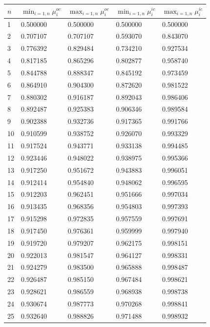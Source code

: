 \begin{figure}[htbp]
\begin{center}
\begin{tiny}
\begin{tabular}{|l|l||l|l|l|}
\hline
$n$ & $\min_{i=1,n}\mu_i^{oc}$ & $\max_{i=1,n}\mu_i^{oc}$ & $\min_{i=1,n}\mu_i^{ic}$ & $\max_{i=1,n}\mu_i^{ic}$ \\
\hline
1 & 0.500000 & 0.500000 & 0.500000 & 0.500000\\
2 & 0.707107 & 0.707107 & 0.593070 & 0.843070\\
3 & 0.776392 & 0.829484 & 0.734210 & 0.927534\\
4 & 0.817185 & 0.865296 & 0.802877 & 0.958740\\
5 & 0.844788 & 0.888347 & 0.845192 & 0.973459\\
6 & 0.864910 & 0.904300 & 0.872620 & 0.981522\\
7 & 0.880302 & 0.916187 & 0.892043 & 0.986406\\
8 & 0.892487 & 0.925383 & 0.906346 & 0.989584\\
9 & 0.902388 & 0.932736 & 0.917365 & 0.991766\\
10 & 0.910599 & 0.938752 & 0.926070 & 0.993329\\
11 & 0.917524 & 0.943771 & 0.933138 & 0.994485\\
12 & 0.923446 & 0.948022 & 0.938975 & 0.995366\\
13 & 0.917250 & 0.951672 & 0.943883 & 0.996051\\
14 & 0.912414 & 0.954840 & 0.948062 & 0.996595\\
15 & 0.912203 & 0.962451 & 0.951666 & 0.997034\\
16 & 0.913435 & 0.968356 & 0.954803 & 0.997393\\
17 & 0.915298 & 0.972835 & 0.957559 & 0.997691\\
18 & 0.917450 & 0.976361 & 0.959999 & 0.997940\\
19 & 0.919720 & 0.979207 & 0.962175 & 0.998151\\
20 & 0.922013 & 0.981547 & 0.964127 & 0.998331\\
21 & 0.924279 & 0.983500 & 0.965888 & 0.998487\\
22 & 0.926487 & 0.985150 & 0.967484 & 0.998621\\
23 & 0.928621 & 0.986559 & 0.968938 & 0.998738\\
24 & 0.930674 & 0.987773 & 0.970268 & 0.998841\\
25 & 0.932640 & 0.988826 & 0.971488 & 0.998932\\

\end{tabular}
\end{tiny}
\end{center}
\end{figure}
